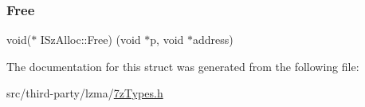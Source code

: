 \mbox{\label{struct_i_sz_alloc_a3a92ced27cca6cd4c948cbf9dfe4d700}} 
\subsubsection{\texorpdfstring{Free}{Free}}
{\footnotesize\ttfamily void($\ast$ I\+Sz\+Alloc\+::\+Free) (void $\ast$p, void $\ast$address)}



The documentation for this struct was generated from the following file\+:\begin{DoxyCompactItemize}
\item 
src/third-\/party/lzma/\mbox{\hyperlink{7z_types_8h}{7z\+Types.\+h}}\end{DoxyCompactItemize}
